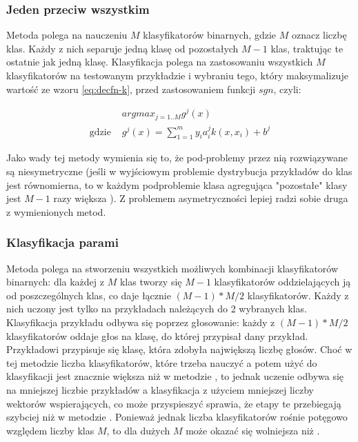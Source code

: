 \subsubsection{Jeden przeciw wszystkim}
Metoda  polega na nauczeniu $ M $ klasyfikatorów binarnych, gdzie $ M $ oznacz liczbę klas. Każdy z nich separuje jedną klasę od pozostałych $ M-1 $ klas, traktując te ostatnie jak jedną klasę. Klasyfikacja polega na zastosowaniu wszystkich $ M $ klasyfikatorów na testowanym przykładzie i wybraniu tego, który maksymalizuje wartość ze wzoru \ref{eq:decfn-k}, przed zastosowaniem funkcji $ sgn $, czyli:

$$
\begin{array}{ll}
 & argmax_{j=1..M} g^j(x) \\
\text{gdzie } & g^j(x) = \sum_{1=1}^m y_ia_i^j k(x, x_i) + b^j
\end{array}
$$



Jako wady tej metody wymienia się to, że pod-problemy przez nią rozwiązywane są niesymetryczne (jeśli w wyjściowym problemie dystrybucja przykładów do klas jest równomierna, to w każdym podproblemie klasa agregująca "pozostałe" klasy jest $ M-1 $ razy większa ). Z problemem asymetryczności lepiej radzi sobie druga z wymienionych metod.

\subsubsection{Klasyfikacja parami}
Metoda  polega na stworzeniu wszystkich możliwych kombinacji klasyfikatorów binarnych: dla każdej z $ M $ klas tworzy się $ M-1 $ klasyfikatorów oddzielających ją od poszczególnych klas, co daje łącznie $ (M-1)*M/2 $ klasyfikatorów. Każdy z nich uczony jest tylko na przykładach należących do 2 wybranych klas. Klasyfikacja przykładu odbywa się poprzez głosowanie: każdy z $ (M-1)*M/2 $ klasyfikatorów oddaje głos na klasę, do której przypisał dany przykład. Przykładowi przypisuje się klasę, która zdobyła największą liczbę głosów.
Choć w tej metodzie liczba klasyfikatorów, które trzeba nauczyć a potem użyć do klasyfikacji jest znacznie większa niż w metodzie , to jednak uczenie odbywa się na mniejszej liczbie przykładów a klasyfikacja z użyciem mniejszej liczby wektorów wspierających, co może przyspieszyć sprawia, że etapy te przebiegają szybciej niż w metodzie . Ponieważ jednak liczba klasyfikatorów rośnie potęgowo względem liczby klas $ M $, to dla dużych $ M $  może okazać się wolniejsza niż .


